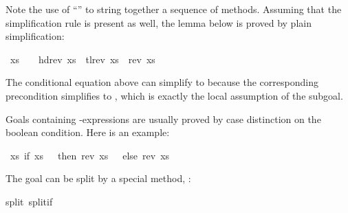 \begin{isabellebody}
\isamarkupfalse%
\isamarkupfalse%
%
\begin{isamarkuptext}%
\noindent
Note the use of ``'' to string together a
sequence of methods. Assuming that the simplification rule
is present as well,
the lemma below is proved by plain simplification:%
\end{isamarkuptext}%
\isamarkuptrue%
\ {\isachardoublequote}xs\ {\isasymnoteq}\ {\isacharbrackleft}{\isacharbrackright}\ {\isasymLongrightarrow}\ hd{\isacharparenleft}rev\ xs{\isacharparenright}\ {\isacharhash}\ tl{\isacharparenleft}rev\ xs{\isacharparenright}\ {\isacharequal}\ rev\ xs{\isachardoublequote}\isamarkupfalse%
\isamarkupfalse%
%
\begin{isamarkuptext}%
\noindent
The conditional equation  above
can simplify  to 
because the corresponding precondition 
simplifies to , which is exactly the local
assumption of the subgoal.%
\end{isamarkuptext}%
\isamarkuptrue%
%
\isamarkuptrue%
%
\begin{isamarkuptext}%
\label{sec:AutoCaseSplits}%
Goals containing -expressions
are usually proved by case
distinction on the boolean condition.  Here is an example:%
\end{isamarkuptext}%
\isamarkuptrue%
\ {\isachardoublequote}{\isasymforall}xs{\isachardot}\ if\ xs\ {\isacharequal}\ {\isacharbrackleft}{\isacharbrackright}\ then\ rev\ xs\ {\isacharequal}\ {\isacharbrackleft}{\isacharbrackright}\ else\ rev\ xs\ {\isasymnoteq}\ {\isacharbrackleft}{\isacharbrackright}{\isachardoublequote}\isamarkupfalse%
%
\begin{isamarkuptxt}%
\noindent
The goal can be split by a special method, :%
\end{isamarkuptxt}%
\isamarkuptrue%
split\ split{\isacharunderscore}if{\isacharparenright}\isamarkupfalse%

\end{isabellebody}
